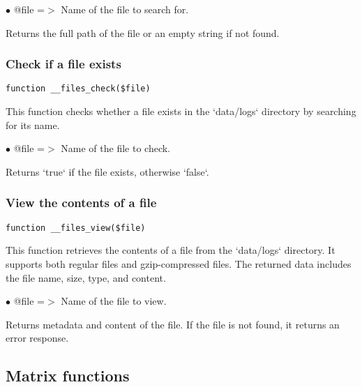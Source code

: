 \documentclass[a4paper]{article}
\begin{document}
\begin{compactitem}
\item[\color{myblue}$\bullet$] @file =$>$ Name of the file to search for.
\end{compactitem}

Returns the full path of the file or an empty string if not found.

\hypertarget{toc32}{}
\subsubsection{Check if a file exists}

\begin{lstlisting}
function __files_check($file)
\end{lstlisting}

This function checks whether a file exists in the `data/logs` directory by searching for its name.

\begin{compactitem}
\item[\color{myblue}$\bullet$] @file =$>$ Name of the file to check.
\end{compactitem}

Returns `true` if the file exists, otherwise `false`.

\hypertarget{toc33}{}
\subsubsection{View the contents of a file}

\begin{lstlisting}
function __files_view($file)
\end{lstlisting}

This function retrieves the contents of a file from the `data/logs` directory. It supports both
regular files and gzip-compressed files. The returned data includes the file name, size, type, and content.

\begin{compactitem}
\item[\color{myblue}$\bullet$] @file =$>$ Name of the file to view.
\end{compactitem}

Returns metadata and content of the file. If the file is not found, it returns an error response.

\hypertarget{toc34}{}
\subsection{Matrix functions}
\end{document}
